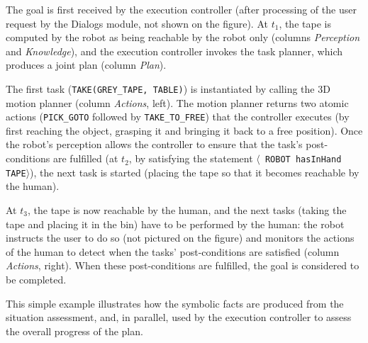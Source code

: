 \documentclass[preprint,3p,times]{elsarticle}
\newcommand{\stmt}[1]{{\footnotesize \tt $\langle$ #1\relax$\rangle$}}
\begin{document}
The goal is first received by the execution controller (after processing of the
user request by the {\sc Dialogs} module, not shown on the figure). At
$t_1$, the tape is computed by the robot as being reachable by the robot only
(columns \emph{Perception} and \emph{Knowledge}), and the execution controller
invokes the task planner, which produces a joint plan (column \emph{Plan}).

The first task ({\tt TAKE(GREY\_TAPE, TABLE)}) is instantiated by calling the 3D
motion planner (column \emph{Actions}, left). The motion planner returns two atomic
actions ({\tt PICK\_GOTO} followed by {\tt TAKE\_TO\_FREE}) that the controller
executes (by first reaching the object, grasping it and bringing it back to a
free position).  Once the robot's perception allows the controller to ensure
that the task's post-conditions are fulfilled (at $t_2$, by satisfying the
statement \stmt{ROBOT hasInHand TAPE}), the next task is started (placing the
tape so that it becomes reachable by the human).

At $t_3$, the tape is now reachable by the human, and the next tasks (taking the
tape and placing it in the bin) have to be performed by the human: the robot
instructs the user to do so (not pictured on the figure) and monitors the
actions of the human to detect when the tasks' post-conditions are satisfied
(column \emph{Actions}, right). When these post-conditions are fulfilled, the
goal is considered to be completed.

This simple example illustrates how the symbolic facts are produced from the
situation assessment, and, in parallel, used by the execution controller to
assess the overall progress of the plan.
\end{document}
